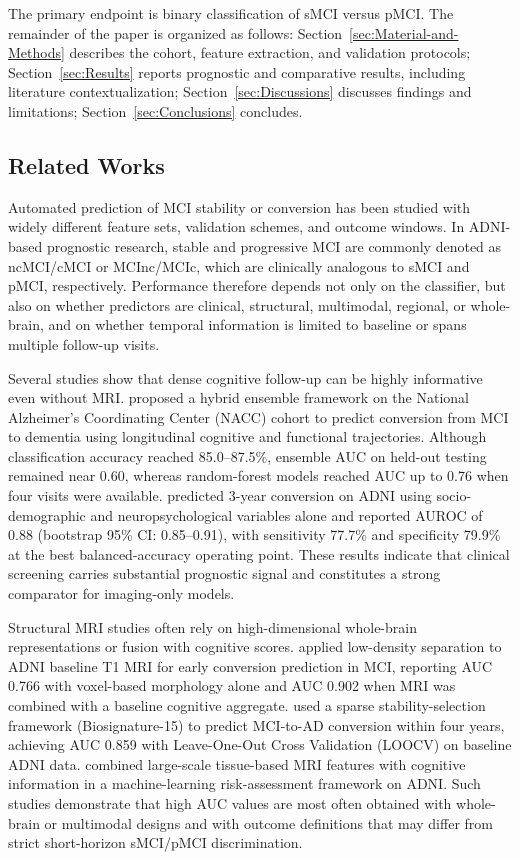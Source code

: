 \documentclass[review]{elsarticle}
\begin{document}
	The primary endpoint is binary classification of sMCI versus pMCI. The remainder of the paper is organized as follows: Section~\ref{sec:Material-and-Methods} describes the cohort, feature extraction, and validation protocols; Section~\ref{sec:Results} reports prognostic and comparative results, including literature contextualization; Section~\ref{sec:Discussions} discusses findings and limitations; Section~\ref{sec:Conclusions} concludes.
	
	\subsection{Related Works}
	\label{subsec:Related-Works}
	
	Automated prediction of MCI stability or conversion has been studied with widely different feature sets, validation schemes, and outcome windows. In ADNI-based prognostic research, stable and progressive MCI are commonly denoted as ncMCI/cMCI or MCInc/MCIc, which are clinically analogous to sMCI and pMCI, respectively. Performance therefore depends not only on the classifier, but also on whether predictors are clinical, structural, multimodal, regional, or whole-brain, and on whether temporal information is limited to baseline or spans multiple follow-up visits.
	
	Several studies show that dense cognitive follow-up can be highly informative even without MRI. \citet{bucholc-2023} proposed a hybrid ensemble framework on the National Alzheimer's Coordinating Center (NACC) cohort to predict conversion from MCI to dementia using longitudinal cognitive and functional trajectories. Although classification accuracy reached 85.0--87.5\%, ensemble AUC on held-out testing remained near 0.60, whereas random-forest models reached AUC up to 0.76 when four visits were available. \citet{grassi-2019} predicted 3-year conversion on ADNI using socio-demographic and neuropsychological variables alone and reported AUROC of 0.88 (bootstrap 95\% CI: 0.85--0.91), with sensitivity 77.7\% and specificity 79.9\% at the best balanced-accuracy operating point. These results indicate that clinical screening carries substantial prognostic signal and constitutes a strong comparator for imaging-only models.
	
	Structural MRI studies often rely on high-dimensional whole-brain representations or fusion with cognitive scores. \citet{moradi-2015} applied low-density separation to ADNI baseline T1 MRI for early conversion prediction in MCI, reporting AUC 0.766 with voxel-based morphology alone and AUC 0.902 when MRI was combined with a baseline cognitive aggregate. \citet{ye-2012} used a sparse stability-selection framework (Biosignature-15) to predict MCI-to-AD conversion within four years, achieving AUC 0.859 with Leave-One-Out Cross Validation (LOOCV) on baseline ADNI data. \citet{casanova-2013} combined large-scale tissue-based MRI features with cognitive information in a machine-learning risk-assessment framework on ADNI. Such studies demonstrate that high AUC values are most often obtained with whole-brain or multimodal designs and with outcome definitions that may differ from strict short-horizon sMCI/pMCI discrimination.
	
\end{document}

